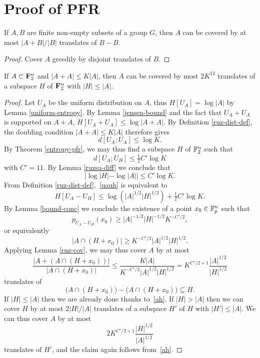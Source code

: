 \chapter{Proof of PFR}

\begin{lemma}
\label{ruz-cov}
\leanok
If $A,B$ are finite non-empty subsets of a group $G$, then $A$ can be covered by at most $|A+B|/|B|$ translates of $B-B$.
\end{lemma}
\begin{proof}
\leanok
Cover $A$ greedily by disjoint translates of $B$.
\end{proof}

\begin{theorem}[PFR]\label{pfr}
If $A \subset {\bf F}_2^n$ and $|A+A| \leq K|A|$, then $A$ can be covered by most $2K^{12}$ translates of a subspace $H$ of ${\bf F}_2^n$ with $|H| \leq |A|$.
\end{theorem}

\begin{proof}
  Let $U_A$ be the uniform distribution on $A$, thus $H[U_A] = \log |A|$ by Lemma \ref{uniform-entropy}. By Lemma \ref{jensen-bound} and the fact that $U_A + U_A$ is supported on $A + A$, $H[U_A + U_A] \leq \log|A+A|$. By Definition \ref{ruz-dist-def}, the doubling condition $|A+A| \leq K|A|$ therefore gives
  \[ d[U_A;U_A] \leq \log K.\]
  By Theorem \ref{entropy-pfr}, we may thus find a subspace $H$ of $\mathbb{F}_2^n$ such that
  \begin{equation}\label{uauh} d[U_A;U_H] \leq \tfrac{1}{2} C' \log K\end{equation}
  with $C' = 11$.
  By Lemma \ref{ruzsa-diff} we conclude that
  \begin{equation}\label{ah}
    |\log |H| - \log |A|| \leq C' \log K.
  \end{equation}
  From Definition \ref{ruz-dist-def},~\eqref{uauh} is equivalent to
  \[ H[U_A - U_H] \leq \log( |A|^{1/2} |H|^{1/2}) + \tfrac{1}{2} C' \log K.\]
  By Lemma \ref{bound-conc} we conclude the existence of a point $x_0 \in \mathbb{F}_p^n$ such that
  \[ p_{U_A-U_H}(x_0) \geq |A|^{-1/2} |H|^{-1/2} K^{-C'/2},\]
  or equivalently
  \[ |A \cap (H + x_0)| \geq K^{-C'/2} |A|^{1/2} |H|^{1/2}.\]
  Applying Lemma \ref{ruz-cov}, we may thus cover $A$ by at most
  \[ \frac{|A + (A \cap (H+x_0))|}{|A \cap (H + x_0)|} \leq \frac{K|A|}{K^{-C'/2} |A|^{1/2} |H|^{1/2}} = K^{C'/2+1} \frac{|A|^{1/2}}{|H|^{1/2}}\]
  translates of
  \[ \bigl(A \cap (H + x_0)\bigr) - \bigl(A \cap (H + x_0)\bigr) \subseteq H.\]
  If $|H| \leq |A|$ then we are already done thanks to~\eqref{ah}.  If $|H| > |A|$ then we can cover $H$ by at most $2 |H|/|A|$ translates of a subspace $H'$ of $H$ with $|H'| \leq |A|$.  We can thus cover $A$ by at most
  \[ 2K^{C'/2+1} \frac{|H|^{1/2}}{|A|^{1/2}}\]
  translates of $H'$, and the claim again follows from~\eqref{ah}.
\end{proof}
